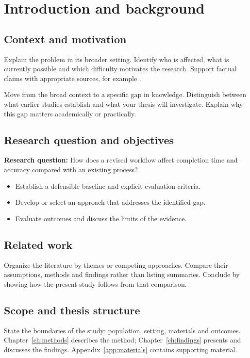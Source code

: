 \chapter{Introduction and background}
\label{ch:introduction}
\section{Context and motivation}
Explain the problem in its broader setting. Identify who is affected, what is
currently possible and which difficulty motivates the research. Support factual
claims with appropriate sources, for example \cite{example}.

Move from the broad context to a specific gap in knowledge. Distinguish between
what earlier studies establish and what your thesis will investigate. Explain
why this gap matters academically or practically.
\section{Research question and objectives}
\textbf{Research question:} How does a revised workflow affect completion time
and accuracy compared with an existing process?
\begin{itemize}
\item Establish a defensible baseline and explicit evaluation criteria.
\item Develop or select an approach that addresses the identified gap.
\item Evaluate outcomes and discuss the limits of the evidence.
\end{itemize}
\section{Related work}
Organize the literature by themes or competing approaches. Compare their
assumptions, methods and findings rather than listing summaries. Conclude by
showing how the present study follows from that comparison.
\section{Scope and thesis structure}
State the boundaries of the study: population, setting, materials and outcomes.
Chapter~\ref{ch:methods} describes the method; Chapter~\ref{ch:findings} presents
and discusses the findings. Appendix~\ref{app:materials} contains supporting material.

